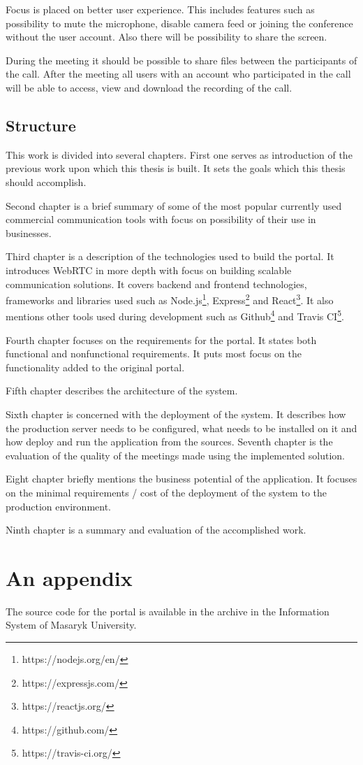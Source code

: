 \documentclass[
  digital, %
  table,   %
  lof,     %
  nolot,     %
]{fithesis3}
\begin{document}
 Focus is placed on better user experience. This includes features such as possibility to mute the microphone, disable camera feed or joining  the conference without the user account. Also there will be possibility to share the screen.
 
During the meeting it should be possible to share files between the participants of the call. After the meeting all users with an account who participated in the call will be able to access, view and download the recording of the call.

\section{Structure}
This work is divided into several chapters. First one serves as introduction of the previous work upon which this thesis is built. It sets the goals which this thesis should accomplish.

Second chapter is a brief summary of some of the most popular currently used commercial communication tools with focus on possibility of their use in businesses.

Third chapter is a description of the technologies used to build the portal. It introduces WebRTC in more depth with focus on building scalable communication solutions. It covers backend and frontend technologies, frameworks and libraries used such as Node.js\footnote{https://nodejs.org/en/}, Express\footnote{https://expressjs.com/} and React\footnote{https://reactjs.org/}. It also mentions other tools used during development such as Github\footnote{https://github.com/} and Travis CI\footnote{https://travis-ci.org/}.

Fourth chapter focuses on the requirements for the portal. It states both functional and nonfunctional requirements. It puts most focus on the functionality added to the original portal.

Fifth chapter describes the architecture of the system.

Sixth chapter is concerned with the deployment of the system. It describes how the production server needs to be configured, what needs to be installed on it and how deploy and run the application from the sources.
Seventh chapter is the evaluation of the quality of the meetings made using the implemented solution.

Eight chapter briefly mentions the business potential of the application. It focuses on the minimal requirements / cost of the deployment of the system to the production environment.

Ninth chapter is a summary and evaluation of the accomplished work.

\printbibliography[heading=bibintoc] %

\appendix %
\chapter{An appendix}
The source code for the portal is available in the archive in the Information System of Masaryk University.
\end{document}
